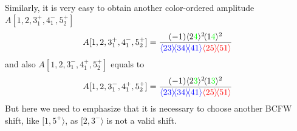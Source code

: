 \documentclass[12pt]{article}
\newcommand{\mdavg}[2]{\langle #1 \rangle\!\langle #2 \rangle}
\newcommand{\avg}[1]{\langle #1 \rangle}
\begin{document}
\par
Similarly, it is very easy to obtain another color-ordered amplitude $A[1,2,3_1^+,4_1^-,5_2^+]$
\begin{align*}
    A[1,2,3_1^+,4_1^-,5_2^+]=
    \frac{(-1)\avg{2\textcolor{green}{4}}^2\!\avg{1\textcolor{green}{4}}^2}{\textcolor{blue}{\mdavg{23}{34}\!\avg{41}}\textcolor{red}{\mdavg{25}{51}}}
\end{align*}
and also $A[1,2,3_1^-,4_1^+,5_2^+]$ equals to
\begin{equation*}
    A[1,2,3_1^-,4_1^+,5_2^+]=
    \frac{(-1)\avg{2\textcolor{green}{3}}^2\!\avg{1\textcolor{green}{3}}^2}{\textcolor{blue}{\mdavg{23}{34}\!\avg{41}}\textcolor{red}{\mdavg{25}{51}}}
\end{equation*}
But here we need to emphasize that it is necessary to choose another BCFW shift, like $[1,5^+ \rangle$, as $[2,3^- \rangle$ is not a valid shift. 
\end{document}
